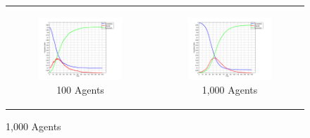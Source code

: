 \begin{figure}
\begin{center}
	\begin{tabular}{c c}
		\begin{subfigure}[b]{0.3\textwidth}
			\centering
			\includegraphics[width=1\textwidth, angle=0]{./../shared/fig/frabs/SIR_100agents_150t_01dt_NOSS_parallel_10replications.png}
			\caption{100 Agents}
			\label{fig:sir_abs_agents_repls_100}
		\end{subfigure}
    	&
		\begin{subfigure}[b]{0.3\textwidth}
			\centering
			\includegraphics[width=1\textwidth, angle=0]{./../shared/fig/frabs/SIR_1000agents_150t_01dt_NOSS_parallel_10replications.png}
			\caption{1,000 Agents}
			\label{fig:sir_abs_agents_repls_1000}
		\end{subfigure}
    	

\end{tabular}
\end{center}
\end{figure}
